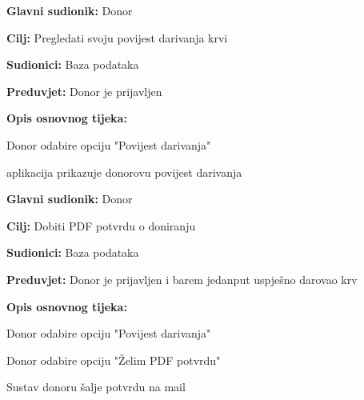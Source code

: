 					\begin{packed_item}
	
						\item \textbf{Glavni sudionik: }Donor
						\item \textbf{Cilj:} Pregledati svoju povijest darivanja krvi
						\item \textbf{Sudionici:} Baza podataka
						\item \textbf{Preduvjet:} Donor je prijavljen
						\item \textbf{Opis osnovnog tijeka:}
						
						\item[] \begin{packed_enum}
	
							\item Donor odabire opciju "Povijest darivanja"
							\item aplikacija prikazuje donorovu povijest darivanja
							
						\end{packed_enum}

					\end{packed_item}
\eject 
\noindent {}
					\begin{packed_item}
	
						\item \textbf{Glavni sudionik: }Donor
						\item \textbf{Cilj:} Dobiti PDF potvrdu o doniranju
						\item \textbf{Sudionici:} Baza podataka
						\item \textbf{Preduvjet:} Donor je prijavljen i barem jedanput uspješno darovao krv
						\item \textbf{Opis osnovnog tijeka:}
						
						\item[] \begin{packed_enum}
	
							\item Donor odabire opciju "Povijest darivanja"
							\item Donor odabire opciju "Želim PDF potvrdu"
							\item Sustav donoru šalje potvrdu na mail
							
						\end{packed_enum}

					\end{packed_item}

